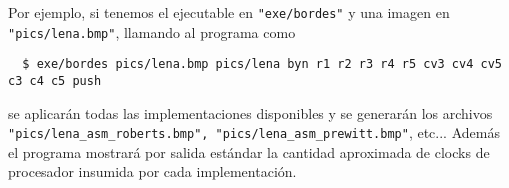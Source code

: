 Por ejemplo, si tenemos el ejecutable en \verb="exe/bordes"= y una imagen en \verb="pics/lena.bmp"=, llamando al programa como

\verb=  $ exe/bordes pics/lena.bmp pics/lena byn r1 r2 r3 r4 r5 cv3 cv4 cv5 c3 c4 c5 push =

se aplicarán todas las implementaciones disponibles y se generarán los archivos \verb="pics/lena_asm_roberts.bmp", "pics/lena_asm_prewitt.bmp"=, etc... Además el programa mostrará por salida estándar la cantidad aproximada de clocks de procesador insumida por cada implementación.

    